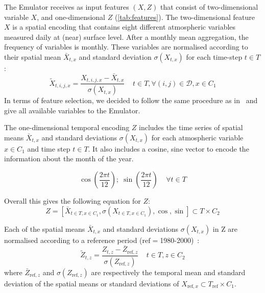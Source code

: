 \documentclass[a4paper,11pt,oneside]{report}
\begin{document}
The Emulator receives as input features $(X, Z)$ that consist of two-dimensional variable $X$, and one-dimensional $Z$ (\autoref{tab:features}). The two-dimensional feature $X$ is a spatial encoding that contains eight different atmospheric variables measured daily at (near) surface level. After a monthly mean aggregation, the frequency of variables is monthly. These variables are normalised according to their spatial mean $\bar{X}_{t,x}$ and standard deviation $\sigma(X_{t,x})$ for each time-step $t\in T$:
\begin{equation}\label{eq:normalisation-X}
            \tilde{X}_{t,i,j,x} = \frac{X_{t,i,j,x}-\bar{X}_{t,x}}{\sigma(X_{t,x})} \;\;\;\; t\in T, \forall (i,j) \in \mathcal{D}, x\in C_1
\end{equation}
In terms of feature selection, we decided to follow the same procedure as in~\cite{Doury} and give all available variables to the Emulator. 


The one-dimensional temporal encoding $Z$ includes the time series of spatial means $\bar{X}_{t,x}$ and standard deviations $\sigma(X_{t,x})$ for each atmospheric variable $x\in C_1$ and time step $t\in T$. It also includes a cosine, sine vector to encode the information about the month of the year. 

\begin{equation*}
       \operatorname{cos}\left(\frac{2\pi t}{12}\right);\; \operatorname{sin}\left(\frac{2\pi t}{12}\right) \;\;\;\; \forall t\in T
\end{equation*}

Overall this gives the following equation for $Z$:
\begin{equation}\label{eq:Z}
    Z = \left[ \bar{X}_{t\in T, x\in C_1}, \sigma\left(X_{t\in T, x\in C_1}\right), \operatorname{cos}, \operatorname{sin} \right] \subset T \times C_2
\end{equation}

Each of the spatial means $\bar{X}_{t,x}$ and standard deviations $\sigma(X_{t,x})$ in Z are normalised according to a reference period ($\mathrm{ref}=$1980-2000)~\cite{Doury}:
\begin{equation}\label{eq:normalisation-Z}
    \tilde{Z}_{t,z} = \frac{Z_{t,z}-\bar{Z}_{\mathrm{\mathrm{ref}},z}}{\sigma(Z_{\mathrm{ref},z})} \;\;\;\; t\in T, z\in C_2
\end{equation}
where $\bar{Z}_{\mathrm{ref},z}$ and $\sigma(Z_{\mathrm{ref},z})$ are respectively the temporal mean and standard deviation of the spatial means or standard deviations of $X_{\mathrm{ref}, x} \subset T_{\mathrm{ref}}\times C_1$.
\end{document}
